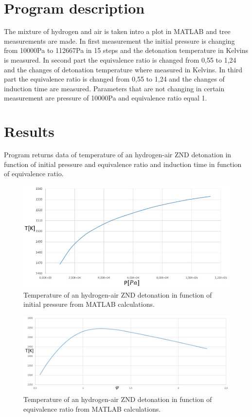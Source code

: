 \documentclass[a4paper]{article}
\begin{document}
\section{Program description}

The mixture of hydrogen and air is taken intro a plot in MATLAB and tree measurements are made. In first measurement the initial pressure is changing from 10000Pa to 112667Pa in 15 steps and the detonation temperature in Kelvins is measured. In second part the equivalence ratio is changed from 0,55 to 1,24 and the changes of detonation temperature where measured in Kelvins. In third part the equivalence ratio is changed from 0,55 to 1,24 and the changes of induction time are measured. Parameters that are not changing in certain measurement are pressure of 10000Pa and equivalence ratio equal 1.

\section{Results}
Program returns data of temperature of an hydrogen-air ZND detonation in function of initial pressure and equivalence ratio and induction time in function of equivalence ratio.
\begin{figure}[h!]
\includegraphics[width=1\textwidth]{1.jpg}
\caption{\label{fig:1}Temperature of an hydrogen-air ZND detonation in function of initial pressure from MATLAB calculations.}
\end{figure}

\begin{figure}[h!]
\includegraphics[width=1\textwidth]{2.jpg}
\caption{\label{fig:2}Temperature of an hydrogen-air ZND detonation in function of equivalence ratio from MATLAB calculations.}
\end{figure}
\end{document}
